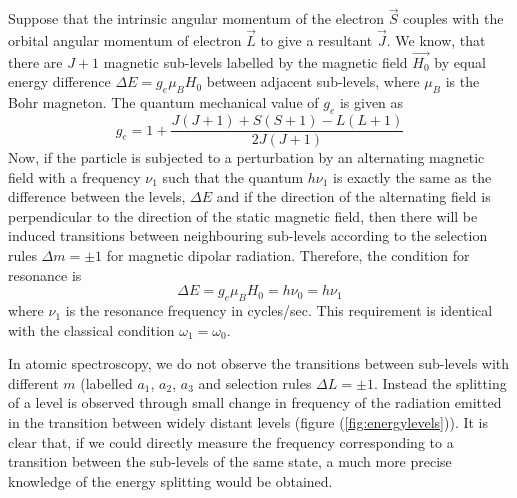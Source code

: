 \documentclass[%
 reprint,
nofootinbib,
 amsmath,amssymb,
 aps,
floatfix,
]{revtex4-2}
\begin{document}
    \par
    Suppose that the intrinsic angular momentum of the electron $\Vec{S}$ couples with the orbital angular momentum of electron $\Vec{L}$ to give a resultant $\Vec{J}$. We know, that there are $J+1$ magnetic sub-levels labelled by the magnetic field $\Vec{H_0}$ by equal energy difference $\Delta E = g_e \mu_B H_0$ between adjacent sub-levels, where $\mu_B$ is the Bohr magneton. The quantum mechanical value of $g_e$ is given as
    \begin{equation}
    \label{eqlande}
        g_e = 1 + \dfrac{J (J+1) + S (S+1) - L (L+1)}{2 J (J+1)}
    \end{equation}
    Now, if the particle is subjected to a perturbation by an alternating magnetic field with a frequency $\nu_1$ such that the quantum $h \nu_1$ is exactly the same as the difference between the levels, $\Delta E$ and if the direction of the alternating field is perpendicular to the direction of the static magnetic field, then there will be induced transitions between neighbouring sub-levels according to the selection rules $\Delta m = \pm 1$ for magnetic dipolar radiation. Therefore, the condition for resonance is
    \begin{equation}
    \label{eqDelE}
        \Delta E = g_e \mu_B H_0 = h \nu_0 = h \nu_1
    \end{equation}
    where $\nu_1$ is the resonance frequency in cycles/sec. This requirement is identical with the classical condition $\omega_1 = \omega_0$.
    \par
    In atomic spectroscopy, we do not observe the transitions between sub-levels with different $m$ (labelled $a_1$, $a_2$, $a_3$ and selection rules $\Delta L = \pm 1$. Instead the splitting of a level is observed through small change in frequency of the radiation emitted in the transition between widely distant levels (figure (\ref{fig:energylevels})). It is clear that, if we could directly measure the frequency corresponding to a transition between the sub-levels of the same state, a much more precise knowledge of the energy splitting would be obtained.
\end{document}
